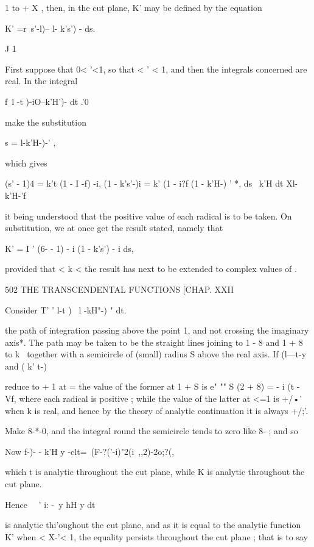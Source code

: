 1 to + X , then, in the cut plane, K' may be defined by the equation 

K' =r\ s'-l)--  l- k's') -   ds. 

J 1 

First suppose that 0< '<1, so that <  ' < 1, and then the integrals 
concerned are real. In the integral 

f\ l -t )-iO--k'H')- dt 
.'0 

make the substitution 

s =  l-k'H-)-' , 

which gives 

(s' - 1)4 = k't (1 - I -f) -i, (1 - k's'-)i = k' (1 - i?f (1 - k'H-) ' *, 
ds \  k'H 
dt Xl-k'H-'f 

it being understood that the positive value of each radical is to be taken. 
On substitution, we at once get the result stated, namely that 

K' = I ' (6-  - 1) - i (1 - k's') - i ds, 

provided that < k <\; the result has next to be extended to complex values 
of . 



502 THE TRANSCENDENTAL FUNCTIONS [CHAP. XXII 



Consider T' '  l-t )~  l -kH"-) "   dt. 



the path of integration passing above the point 1, and not crossing the imaginary axis*. 
The path may be taken to be the straight lines joining to 1 - 8 and 1 + 8 to k~  together 
with a semicircle of (small) radius S above the real axis. If (l—t-y and ( k' t-)  

reduce to + 1 at   = the value of the former at 1 + S is e" "" S  (2 + 8)  = - i (t  - Vf, where 
each radical is positive ; while the value of the latter at <=1 is +/•' when k is real, and 
hence by the theory of analytic continuation it is always +/;'. 

Make 8-*-0, and the integral round the semicircle tends to zero like 8- ; and so 

Now   f-)- -  k'H y -clt=\ (F-?('-i)"2(i\ ,,2)-2o;?(, 

which t is analytic throughout the cut plane, while K is analytic throughout the cut plane. 

Hence \ \  '   i: -\ y   hH y  dt 

is analytic thi'oughout the cut plane, and as it is equal to the analytic function K' when 
< X-'< 1, the equality persists throughout the cut plane ; that is to say 




